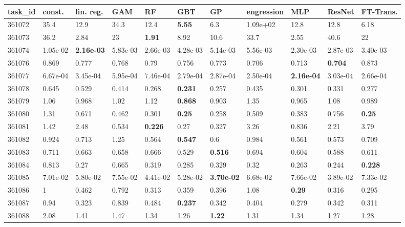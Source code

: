 \begin{table}[ht!]
\centering
\begingroup\footnotesize
\begin{tabular}{lllllllllll}
  \hline
\hline
task\_id & const. & lin. reg. & GAM & RF & GBT & GP & engression & MLP & ResNet & FT-Trans. \\ 
  \hline
361072 & 35.4 & 12.9 & 34.3 & 12.4 & \textbf{5.55} & 6.3 & 1.09e+02 & 12.8 & 12.8 & 6.18 \\ 
  361073 & 36.2 & 2.84 & 23 & \textbf{1.91} & 8.92 & 10.6 & 33.7 & 2.55 & 40.6 & 22 \\ 
  361074 & 1.05e-02 & \textbf{2.16e-03} & 5.83e-03 & 2.66e-03 & 4.28e-03 & 5.14e-03 & 5.56e-03 & 2.30e-03 & 2.87e-03 & 3.40e-03 \\ 
  361076 & 0.869 & 0.777 & 0.768 & 0.79 & 0.756 & 0.773 & 0.706 & 0.713 & \textbf{0.704} & 0.873 \\ 
  361077 & 6.67e-04 & 3.45e-04 & 5.95e-04 & 7.46e-04 & 2.79e-04 & 2.87e-04 & 2.50e-04 & \textbf{2.16e-04} & 3.03e-04 & 2.66e-04 \\ 
  361078 & 0.645 & 0.529 & 0.414 & 0.268 & \textbf{0.231} & 0.257 & 0.435 & 0.301 & 0.331 & 0.277 \\ 
  361079 & 1.06 & 0.968 & 1.02 & 1.12 & \textbf{0.868} & 0.903 & 1.35 & 0.965 & 1.08 & 0.989 \\ 
  361080 & 1.31 & 0.671 & 0.462 & 0.301 & \textbf{0.25} & 0.258 & 0.509 & 0.383 & 0.756 & \textbf{0.25} \\ 
  361081 & 1.42 & 2.48 & 0.534 & \textbf{0.226} & 0.27 & 0.327 & 3.26 & 0.836 & 2.21 & 3.79 \\ 
  361082 & 0.924 & 0.713 & 1.25 & 0.564 & \textbf{0.547} & 0.6 & 0.984 & 0.561 & 0.573 & 0.709 \\ 
  361083 & 0.711 & 0.663 & 0.658 & 0.666 & 0.529 & \textbf{0.516} & 0.694 & 0.604 & 0.588 & 0.611 \\ 
  361084 & 0.813 & 0.27 & 0.665 & 0.319 & 0.285 & 0.329 & 0.32 & 0.263 & 0.244 & \textbf{0.228} \\ 
  361085 & 7.01e-02 & 5.80e-02 & 7.55e-02 & 4.41e-02 & 5.28e-02 & \textbf{3.70e-02} & 6.68e-02 & 7.66e-02 & 3.89e-02 & 7.33e-02 \\ 
  361086 & 1 & 0.462 & 0.792 & 0.313 & 0.359 & 0.396 & 1.08 & \textbf{0.29} & 0.316 & 0.295 \\ 
  361087 & 0.94 & 0.323 & 0.839 & 0.484 & \textbf{0.237} & 0.342 & 0.404 & 0.279 & 0.342 & 0.311 \\ 
  361088 & 2.08 & 1.41 & 1.47 & 1.34 & 1.26 & \textbf{1.22} & 1.31 & 1.34 & 1.27 & 1.28 \\ 

\end{tabular}
\end{table}
